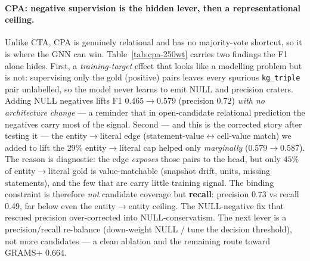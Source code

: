\paragraph{CPA: negative supervision is the hidden lever, then a representational ceiling.}
Unlike CTA, CPA is genuinely relational and has no majority-vote shortcut, so it is
where the GNN can win. Table~\ref{tab:cpa-250wt} carries two findings the F1
alone hides. First, a \emph{training-target} effect that looks like a modelling
problem but is not: supervising only the gold (positive) pairs leaves every
spurious \texttt{kg\_triple} pair unlabelled, so the model never learns to emit
NULL and precision craters. Adding NULL negatives lifts F1 $0.465\!\to\!0.579$
(precision $0.72$) \emph{with no architecture change} --- a reminder that in
open-candidate relational prediction the negatives carry most of the signal.
Second --- and this is the corrected story after testing it --- the
entity$\to$literal edge (statement-value$\leftrightarrow$cell-value match) we added
to lift the $29\%$ entity$\to$literal cap helped only \emph{marginally}
($0.579\!\to\!0.587$). The reason is diagnostic: the edge \emph{exposes} those
pairs to the head, but only $45\%$ of entity$\to$literal gold is value-matchable
(snapshot drift, units, missing statements), and the few that are carry little
training signal. The binding constraint is therefore \emph{not} candidate
coverage but \textbf{recall}: precision $0.73$ vs recall $0.49$, far below even the
entity$\to$entity ceiling. The NULL-negative fix that rescued precision
over-corrected into NULL-conservatism. The next lever is a precision/recall
re-balance (down-weight NULL / tune the decision threshold), not more candidates
--- a clean ablation and the remaining route toward GRAMS+ $0.664$.

